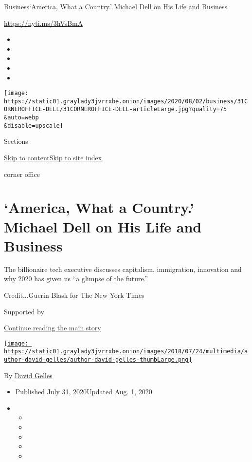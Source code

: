 \href{/section/business}{Business}\textbar{}`America, What a Country.'
Michael Dell on His Life and Business

\url{https://nyti.ms/3hVsBmA}

\begin{itemize}
\item
\item
\item
\item
\item
\end{itemize}

\texttt{[image: https://static01.graylady3jvrrxbe.onion/images/2020/08/02/business/31CORNEROFFICE-DELL/31CORNEROFFICE-DELL-articleLarge.jpg?quality=75\\\&auto=webp\\\&disable=upscale]}

Sections

\protect\hyperlink{site-content}{Skip to
content}\protect\hyperlink{site-index}{Skip to site index}

corner office

\hypertarget{america-what-a-country-michael-dell-on-his-life-and-business}{%
\section{`America, What a Country.' Michael Dell on His Life and
Business}\label{america-what-a-country-michael-dell-on-his-life-and-business}}

The billionaire tech executive discusses capitalism, immigration,
innovation and why 2020 has given us ``a glimpse of the future.''

Credit...Guerin Blask for The New York Times

Supported by

\protect\hyperlink{after-sponsor}{Continue reading the main story}

\href{https://www.nytimes3xbfgragh.onion/by/david-gelles}{\texttt{[image: https://static01.graylady3jvrrxbe.onion/images/2018/07/24/multimedia/author-david-gelles/author-david-gelles-thumbLarge.png]}}

By \href{https://www.nytimes3xbfgragh.onion/by/david-gelles}{David
Gelles}

\begin{itemize}
\item
  Published July 31, 2020Updated Aug. 1, 2020
\item
  \begin{itemize}
  \item
  \item
  \item
  \item
  \item
  \end{itemize}
\end{itemize}

